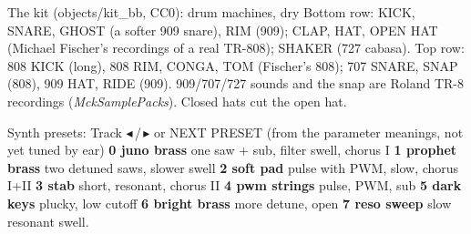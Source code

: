 \documentclass{article}
\newcommand{\DR}[1]{\textcolor{drc}{#1}}
\begin{document}
\begin{minipage}[t]{150mm}
\begin{card}{The kit (objects/kit\_bb, CC0): drum machines, dry}
\fontsize{7}{8.4}\selectfont
Bottom row: \DR{KICK}, \DR{SNARE}, \DR{GHOST} (a softer 909 snare), \DR{RIM} (909); \DR{CLAP}, \DR{HAT}, \DR{OPEN HAT}
(Michael Fischer's recordings of a real TR-808); \DR{SHAKER} (727 cabasa). Top row: \DR{808 KICK} (long),
\DR{808 RIM}, \DR{CONGA}, \DR{TOM} (Fischer's 808); \DR{707 SNARE}, \DR{SNAP} (808), \DR{909 HAT}, \DR{RIDE} (909).
909/707/727 sounds and the snap are Roland TR-8 recordings (\emph{MckSamplePacks}). Closed hats cut the open hat.
\end{card}

\begin{card}{Synth presets: Track \(\blacktriangleleft\)\,/\,\(\blacktriangleright\) or NEXT PRESET \quad\textmd{\fontsize{6.5}{7}\selectfont (from the parameter meanings, not yet tuned by ear)}}
\fontsize{7}{8.4}\selectfont
\textbf{0 juno brass} one saw + sub, filter swell, chorus I \textperiodcentered{}
\textbf{1 prophet brass} two detuned saws, slower swell \textperiodcentered{}
\textbf{2 soft pad} pulse with PWM, slow, chorus I+II \textperiodcentered{}
\textbf{3 stab} short, resonant, chorus II \textperiodcentered{}
\textbf{4 pwm strings} pulse, PWM, sub \textperiodcentered{}
\textbf{5 dark keys} plucky, low cutoff \textperiodcentered{}
\textbf{6 bright brass} more detune, open \textperiodcentered{}
\textbf{7 reso sweep} slow resonant swell.
\end{card}
\end{minipage}\hfill
\end{document}
